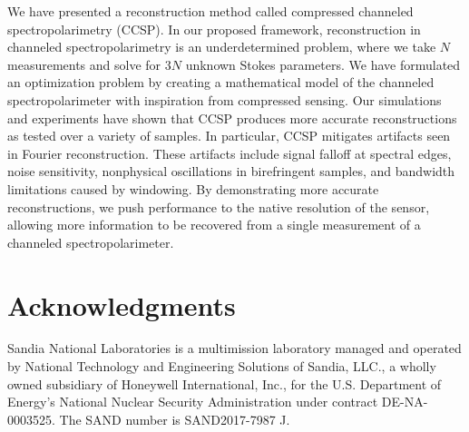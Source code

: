 \documentclass[10pt]{article}
\numberwithin{equation}{subsection}
\begin{document}
We have presented a reconstruction method called compressed channeled spectropolarimetry (CCSP).
    In our proposed framework, reconstruction in channeled spectropolarimetry is an underdetermined problem, where we take $N$ measurements and solve for $3 N$ unknown Stokes parameters.
    We have formulated an optimization problem by creating a mathematical model of the channeled spectropolarimeter with inspiration from compressed sensing.
Our simulations and experiments have shown that CCSP produces more accurate reconstructions as tested over a variety of samples.
In particular, CCSP mitigates artifacts seen in Fourier reconstruction.
These artifacts include signal falloff at spectral edges, noise sensitivity, nonphysical oscillations in birefringent samples, and bandwidth limitations caused by windowing.
    By demonstrating more accurate reconstructions, we push performance to the native resolution of the sensor, allowing more information to be recovered from a single measurement of a channeled spectropolarimeter.


\section*{Acknowledgments}

Sandia National Laboratories is a multimission laboratory managed and operated by National Technology and Engineering Solutions of Sandia, LLC., a wholly owned subsidiary of Honeywell International, Inc., for the U.S. Department of Energy's National Nuclear Security Administration under contract DE-NA-0003525. The SAND number is SAND2017-7987 J.
\end{document}
